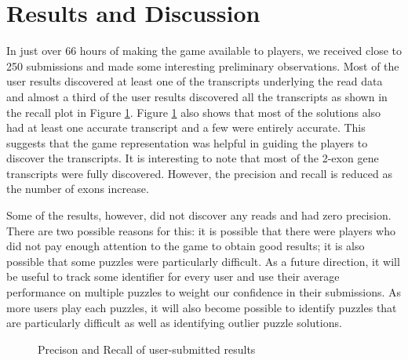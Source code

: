 \documentclass[12pt]{article}
\begin{document}
\section*{Results and Discussion}
In just over 66 hours of making the game available to players, we received close to 250 submissions and made some interesting preliminary observations. Most of the user results discovered at least one of the transcripts underlying the read data and almost a third of the user results discovered all the transcripts as shown in the recall plot in Figure \ref{fig:precisionandrecall}. Figure \ref{fig:precisionandrecall} also shows that most of the solutions also had at least one accurate transcript and a few were entirely accurate. This suggests that the game representation was helpful in guiding the players to discover the transcripts. It is interesting to note that most of the 2-exon gene transcripts were fully discovered. However, the precision and recall is reduced as the number of exons increase.

Some of the results, however, did not discover any reads and had zero precision. There are two possible reasons for this: it is possible that there were players who did not pay enough attention to the game to obtain good results; it is also possible that some puzzles were particularly difficult. As a future direction, it will be useful to track some identifier for every user and use their average performance on multiple puzzles to weight our confidence in their submissions. As more users play each puzzles, it will also become possible to identify puzzles that are particularly difficult as well as identifying outlier puzzle solutions.

\begin{figure}[H]
\centering
{} 
\caption{Precison and Recall of user-submitted results}\label{fig:precisionandrecall}
\end{figure}
\end{document}
